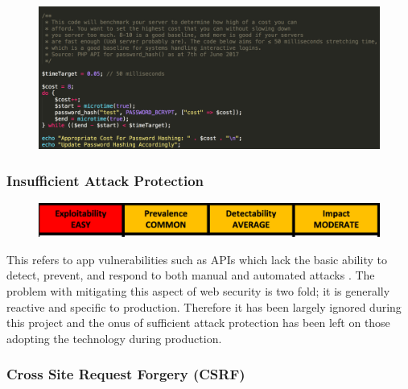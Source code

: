     \begin{figure}[h]
    	\centering
    	\includegraphics[scale=0.4,center]{chapters/chapter03/figures/cost.png}
    	\label{Salth}
    \end{figure}
    
    
    
    
    
    \newpage
    
    \subsubsection{Insufficient Attack Protection}
    
    \begin{figure}[h]
    	\centering
    	\includegraphics[scale=0.5,center]{chapters/chapter03/figures/Attack.png}
    	\label{Attack}
    \end{figure}
    
    This refers to app vulnerabilities such as APIs which lack the basic ability to detect, prevent, and respond to both manual and automated attacks \cite{OWASP2017}. The problem with mitigating this aspect of web security is two fold; it is generally reactive and specific to production. Therefore it has been largely ignored during this project and the onus of sufficient attack protection has been left on those adopting the technology during production.
    
    \subsubsection{Cross Site Request Forgery (CSRF)}
    

